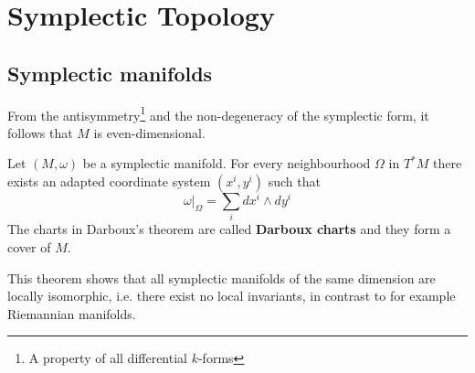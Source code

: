 \chapter{Symplectic Topology}\label{chapter:symplectic}
\section{Symplectic manifolds}

	
	\begin{property}[Dimension]
		From the antisymmetry\footnote{A property of all differential $k$-forms} and the non-degeneracy of the symplectic form, it follows that $M$ is even-dimensional.
	\end{property}
	
	\begin{theorem}[Darboux]
		Let $(M, \omega)$ be a symplectic manifold. For every neighbourhood $\Omega$ in $T^*M$ there exists an adapted coordinate system $(x^i, y^i)$ such that
		\begin{equation}
			\left.\omega\right|_\Omega = \sum_idx^i\wedge dy^i
		\end{equation}		
		{\normalfont The charts in Darboux's theorem are called \textbf{Darboux charts} and they form a cover of $M$.}
	\end{theorem}
	\begin{remark}
		This theorem shows that all symplectic manifolds of the same dimension are locally isomorphic, i.e. there exist no local invariants, in contrast to for example Riemannian manifolds.
	\end{remark}
	
